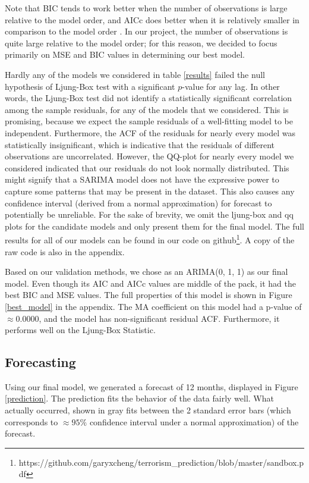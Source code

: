\documentclass[11pt]{paper}
\begin{document}
Note that BIC tends to work better when the number of observations is large relative to the model order, and AICc does better when it is relatively smaller in comparison to the model order \cite{timeseriesanalysis}. In our project, the number of observations is quite large relative to the model order; for this reason, we decided to focus primarily on MSE and BIC values in determining our best model.

Hardly any of the models we considered in table \ref{results} failed the null hypothesis of Ljung-Box test with a significant $p$-value for any lag. In other words, the Ljung-Box test did not identify a statistically significant correlation among the sample residuals, for any of the models that we considered. This is promising, because we expect the sample residuals of a well-fitting model to be independent. Furthermore, the ACF of the residuals for nearly every model was statistically insignificant, which is indicative that the residuals of different observations are uncorrelated. However, the QQ-plot for nearly every model we considered indicated that our residuals do not look normally distributed. This might signify that a SARIMA model does not have the expressive power to capture some patterns that may be present in the dataset. This also causes any confidence interval (derived from a normal approximation) for forecast to potentially be unreliable. For the sake of brevity, we omit the ljung-box and qq plots for the candidate models and only present them for the final model. The full results for all of our models can be found in our code on github\footnote{https://github.com/garyxcheng/terrorism_prediction/blob/master/sandbox.pdf}. A copy of the raw code is also in the appendix.

Based on our validation methods, we chose as an ARIMA(0, 1, 1) as our final model. Even though its AIC and AICc values are middle of the pack, it had the best BIC and MSE values. The full properties of this model is shown in Figure \ref{best_model} in the appendix. The MA coefficient on this model had a p-value of $\approx 0.0000$, and the model has non-significant residual ACF. Furthermore, it performs well on the Ljung-Box Statistic.




\subsection{Forecasting}

Using our final model, we generated a forecast of 12 months, displayed in Figure \ref{prediction}. The prediction fits the behavior of the data fairly well.  What actually occurred, shown in gray fits between the 2 standard error bars (which corresponds to $\approx 95\%$ confidence interval under a normal approximation) of the forecast.
\end{document}
